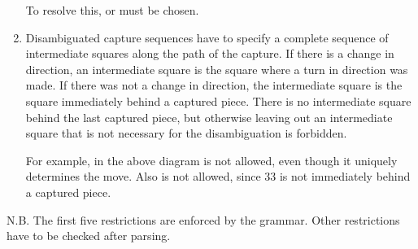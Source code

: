 \documentclass[letterpaper,10pt,english]{sphinxmanual}
\begin{document}
\begin{enumerate}
\noindent{}

\sphinxAtStartPar
To resolve this,  or  must be chosen.

\item {} 
\sphinxAtStartPar
Disambiguated capture sequences have to specify a complete sequence of intermediate squares along the path of the
capture. If there is a change in direction, an intermediate square is the square where a turn in direction was made.
If there was not a change in direction, the intermediate square is the square immediately behind a captured piece.
There is no intermediate square behind the last captured piece, but otherwise leaving out an intermediate square
that is not necessary for the disambiguation is forbidden.

\sphinxAtStartPar
For example, in the above diagram  is not allowed, even though it uniquely determines the move.
Also  is not allowed, since 33 is not immediately behind a captured piece.

\end{enumerate}

\sphinxAtStartPar
N.B. The first five restrictions are enforced by the grammar. Other restrictions have to be checked after parsing.
\end{document}
